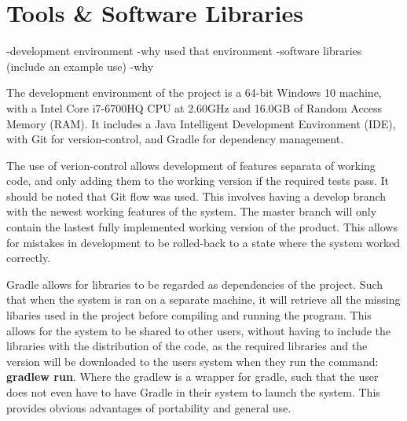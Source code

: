 \section{Tools \& Software Libraries}
-development environment
-why used that environment
-software libraries (include an example use)
-why
\par The development environment of the project is a 64-bit Windows 10 machine, with a Intel Core i7-6700HQ CPU at 2.60GHz and 16.0GB of Random Access Memory (RAM). It includes a Java Intelligent Development Environment (IDE), with Git for version-control, and Gradle for dependency management. 
\par The use of verion-control allows development of features separata of working code, and only adding them to the working version if the required tests pass. It should be noted that Git flow was used. This involves having a develop branch with the newest working features of the system. The master branch will only contain the lastest fully implemented working version of the product. This allows for mistakes in development to be rolled-back to a state where the system worked correctly.
\par Gradle allows for libraries to be regarded as dependencies of the project. Such that when the system is ran on a separate machine, it will retrieve all the missing libaries used in the project before compiling and running the program. This allows for the system to be shared to other users, without having to include the libraries with the distribution of the code, as the required libraries and the version will be downloaded to the users system when they run the command: \textbf{gradlew run}. Where the gradlew is a wrapper for gradle, such that the user does not even have to have Gradle in their system to launch the system. This provides obvious advantages of portability and general use.
